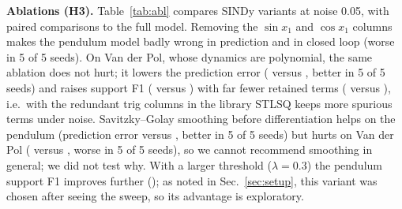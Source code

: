 \textbf{Ablations (H3).} Table~\ref{tab:abl} compares SINDy variants at noise 0.05, with paired comparisons to the full model. Removing the $\sin x_1$ and $\cos x_1$ columns makes the pendulum model badly wrong in prediction and in closed loop (worse in 5 of 5 seeds). On Van der Pol, whose dynamics are polynomial, the same ablation does not hurt; it lowers the prediction error ( versus , better in 5 of 5 seeds) and raises support F1 ( versus ) with far fewer retained terms ( versus ), i.e.\ with the redundant trig columns in the library STLSQ keeps more spurious terms under noise. Savitzky--Golay smoothing before differentiation helps on the pendulum (prediction error  versus , better in 5 of 5 seeds) but hurts on Van der Pol ( versus , worse in 5 of 5 seeds), so we cannot recommend smoothing in general; we did not test why. With a larger threshold ($\lambda=0.3$) the pendulum support F1 improves further (); as noted in Sec.~\ref{sec:setup}, this variant was chosen after seeing the sweep, so its advantage is exploratory.

\begin{table}[t]\centering\caption{SINDy ablations at noise 0.05, $N=1000$, 5 seeds. ``worse ($p$)'': seeds with higher \texttt{pred\_nrmse} than full SINDy (paired $p$); $\Delta$LQR: mean LQR cost of full SINDy minus that of the variant (seeds in which the variant has the higher cost); $p$ and $\Delta$LQR from \texttt{rh compare}. SG: Savitzky--Golay; $\lambda=0.3$ is post hoc.}\label{tab:abl}
\resizebox{\columnwidth}{!}{}\end{table}




